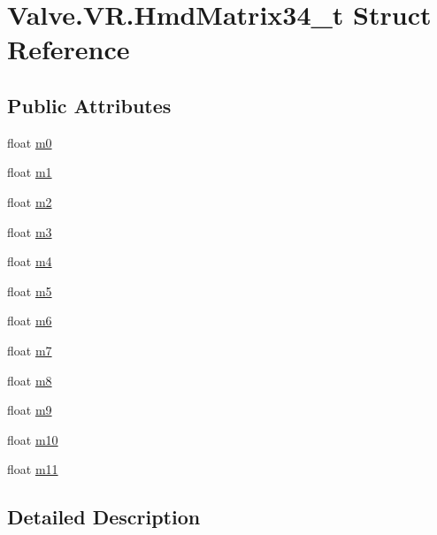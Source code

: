 \hypertarget{struct_valve_1_1_v_r_1_1_hmd_matrix34__t}{}\section{Valve.\+V\+R.\+Hmd\+Matrix34\+\_\+t Struct Reference}
\label{struct_valve_1_1_v_r_1_1_hmd_matrix34__t}
\subsection*{Public Attributes}
\begin{DoxyCompactItemize}
\item 
float \mbox{\hyperlink{struct_valve_1_1_v_r_1_1_hmd_matrix34__t_ae76083ee16462a47961bc62b55ec95dd}{m0}}
\item 
float \mbox{\hyperlink{struct_valve_1_1_v_r_1_1_hmd_matrix34__t_a38aa08a6a6c6a064a9588fb3531b1ac3}{m1}}
\item 
float \mbox{\hyperlink{struct_valve_1_1_v_r_1_1_hmd_matrix34__t_aa25b00363b6a05b9883b3d4b541c42f3}{m2}}
\item 
float \mbox{\hyperlink{struct_valve_1_1_v_r_1_1_hmd_matrix34__t_a6a12aa935ae6da5112d6ed918d8eac4a}{m3}}
\item 
float \mbox{\hyperlink{struct_valve_1_1_v_r_1_1_hmd_matrix34__t_aa1b3ad4cfe8455c6f1d303832e69cb9b}{m4}}
\item 
float \mbox{\hyperlink{struct_valve_1_1_v_r_1_1_hmd_matrix34__t_a19d16ccfc915bd912873cca4b88d1382}{m5}}
\item 
float \mbox{\hyperlink{struct_valve_1_1_v_r_1_1_hmd_matrix34__t_a6e34e038a74c8bf8a7f8c255b81e8655}{m6}}
\item 
float \mbox{\hyperlink{struct_valve_1_1_v_r_1_1_hmd_matrix34__t_a08b45c75cf0c94816f48b6c4e0d4c897}{m7}}
\item 
float \mbox{\hyperlink{struct_valve_1_1_v_r_1_1_hmd_matrix34__t_ab5972fa50a970adab621719b9aaa47bf}{m8}}
\item 
float \mbox{\hyperlink{struct_valve_1_1_v_r_1_1_hmd_matrix34__t_aba4fb1da697d3479b2b7448b339f4b9f}{m9}}
\item 
float \mbox{\hyperlink{struct_valve_1_1_v_r_1_1_hmd_matrix34__t_a9dd6a3e4f4e4d9b2314e009e8e63f5f7}{m10}}
\item 
float \mbox{\hyperlink{struct_valve_1_1_v_r_1_1_hmd_matrix34__t_a1bbdeba3d59213373857bbc96a1dadab}{m11}}
\end{DoxyCompactItemize}


\subsection{Detailed Description}


